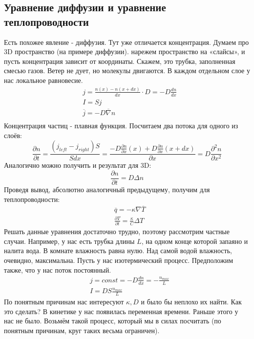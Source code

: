 \documentclass[a4paper, 12pt]{article}
\begin{document}
	\subsection{Уравнение диффузии и уравнение теплопроводности}
	Есть похожее явление - диффузия. Тут уже отличается концентрация. Думаем про 3D пространство (на примере диффузии). нарежем пространство на «слайсы», и пусть концентрация зависит от координаты. Скажем, это трубка, заполненная смесью газов. Ветер не дует, но молекулы двигаются. В каждом отдельном слое у нас локальное равновесие.
	\begin{equation*}
		\begin{aligned}
			& j = \frac{n(x)-n(x+dx)}{dx} \cdot D = - D \frac{dn}{dx} \\
			& I = Sj                                                  \\
			& \overline{j} = - D \overline{\nabla} n                  \\
		\end{aligned}
	\end{equation*}
	Концентрация частиц - плавная функция. Посчитаем два потока для одного из слоёв:
	\begin{equation*}
		\frac{\partial n}{\partial t} =\frac{( j_{left} - j_{right})S} {S dx} = \frac{-D \frac{\partial n}{\partial x} (x) + D \frac{\partial n}{\partial x} (x+dx)}{\partial x} = D \frac{\partial^{2} n}{\partial x^2}
	\end{equation*}
	Аналогично можно получить и результат для 3D:
	\begin{equation*}
		\frac{\partial n}{\partial t} = D \Delta n 
	\end{equation*}
	Проведя вывод, абсолютно аналогичный предыдущему, получим для теплопроводности:
	\begin{equation*}
		\begin{aligned}
			& \overline{q} = - \kappa \nabla \overline{T}               \\
			& \frac{\partial T}{\partial t} = \frac{\kappa}{C} \Delta T 
		\end{aligned}
	\end{equation*}
	Решать данные уравнения достаточно трудно, поэтому рассмотрим частные случаи. Например, у нас есть трубка длины $L$, на одном конце которой запаяно и налита вода. В комнате влажность равна нулю. Над самой водой влажность, очевидно, максимальна. Пусть у нас изотермический процесс. Предположим также, что у нас поток постоянный.
	\begin{equation*}
		\begin{aligned}
			& j = const = -D \frac{dn}{dx} = - \frac{n_{max}}{L} \\
			& I = DS\frac{n_{max}}{L}                            
		\end{aligned}
	\end{equation*}
	По понятным причинам нас интересуют $\kappa, D$ и было бы неплохо их найти. Как это сделать? В кинетике у нас появилась переменная времени. Раньше этого у нас не было. Возьмём такой процесс, который мы в силах посчитать (по понятным причинам, круг таких весьма ограничен).
\end{document}
